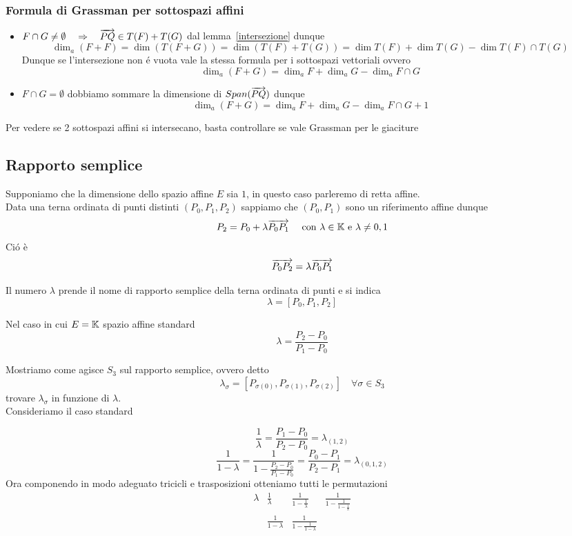 \subsubsection{Formula di Grassman per sottospazi affini}
\begin{itemize}
\item $ F\cap G \neq \emptyset \quad \Rightarrow \quad \overrightarrow{PQ} \in T(F) + T(G) $ dal lemma~\ref{intersezione} dunque
$$ \dim_a (F+F) = \dim (T(F+G))= \dim (T(F)+T(G))= \dim T(F)+\dim T(G) - \dim T(F) \cap T(G)$$
Dunque se l'intersezione non \'e vuota vale la stessa formula per i sottospazi vettoriali ovvero
$$ \dim_a (F+G) = \dim_a F + \dim_a G - \dim_a F \cap G $$
\item $F \cap G = \emptyset$
dobbiamo sommare la dimensione di $Span( \overrightarrow{PQ})$ dunque
$$ \dim_a (F+G) = \dim_a F + \dim_a G - \dim_a F \cap G +1 $$
\end{itemize}
\begin{oss}Per vedere se 2 sottospazi affini si intersecano, basta controllare se vale Grassman per le giaciture
\end{oss}
\newpage
\subsection{Rapporto semplice}
Supponiamo che la dimensione dello spazio affine $E$ sia $1$, in questo caso parleremo di retta affine.\\
Data una terna ordinata di punti distinti $(P_0,P_1,P_2)$ sappiamo che $(P_0, P_1)$ sono un riferimento affine dunque 
$$ P_2= P_0 + \lambda \overrightarrow{P_0P_1 } \quad \text{ con } \lambda \in \mathbb{K} \text{ e } \lambda \neq 0,1 $$
Ci\'o \`e
$$ \overrightarrow{P_0P_2} = \lambda \overrightarrow{ P_0P_1}$$
\begin{defn}Il numero $\lambda $ prende il nome di rapporto semplice della terna ordinata di punti e si indica
$$ \lambda= [P_0,P_1,P_2]$$
\end{defn}
\begin{oss}Nel caso in cui $E=\mathbb{K}$ spazio affine standard
$$ \lambda = \frac{P_2-P_0}{P_1-P_0}$$
\end{oss}
\spazio
Mostriamo come agisce $S_3$ sul rapporto semplice, ovvero detto 
$$ \lambda_\sigma = [P_{\sigma(0)}, P_{\sigma(1)}, P_{\sigma(2)}] \quad \forall \sigma\in S_3$$
trovare $\lambda_\sigma $ in funzione di $\lambda$.\\
Consideriamo il caso standard

$$ \frac{1}{\lambda}= \frac{P_1-P_0}{P_2-P_0}= \lambda_{(1,2)}$$
$$ \frac{1}{1-\lambda}=\frac{1}{1-\frac{P_2-P_0}{P_1-P_0}}=\frac{P_0-P_1}{P_2-P_1}=\lambda_{(0,1,2)}$$
Ora componendo in modo adeguato tricicli e trasposizioni otteniamo tutti le permutazioni
$$ \begin{array}{cccc}
\lambda & \frac{1}{\lambda} & \frac{1}{1-\frac{1}{\lambda}}& \frac{1}{1-\frac{1}{1-\frac{1}{\lambda}}} \\
& \frac{1}{1-\lambda} & \frac{1}{1-\frac{1}{1-\lambda}}& 
\end{array}$$
\spazio

